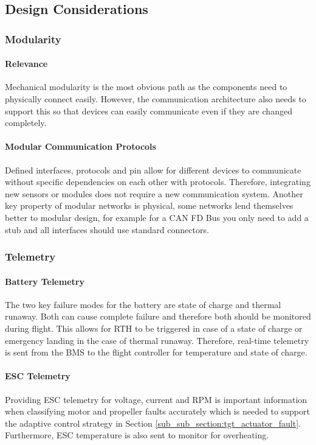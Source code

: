 \subsection{Design Considerations}\label{sub_sub_section:tgt_intra_comms_design_considerations}

\subsubsection{Modularity}\label{sub_sub_section:tgt_modularity}
\paragraph{Relevance}
Mechanical modularity is the most obvious path as the components need to physically connect easily. However, the communication architecture also needs to support this so that devices can easily communicate even if they are changed completely.
\paragraph{Modular Communication Protocols}
Defined interfaces, protocols and pin allow for different devices to communicate without specific dependencies on each other with protocols. Therefore, integrating new sensors or modules does not require a new communication system. Another key property of modular networks is physical, some networks lend themselves better to modular design, for example for a \gls{CAN} FD Bus you only need to add a stub and all interfaces should use standard connectors.

\subsubsection{Telemetry}\label{sub_sub_section:tgt_telemetry}
\paragraph{Battery Telemetry}
The two key failure modes for the battery are state of charge and thermal runaway. Both can cause complete failure and therefore both should be monitored during flight. This allows for \gls{RTH} to be triggered in case of a state of charge or emergency landing in the case of thermal runaway. Therefore, real-time telemetry is sent from the \gls{BMS} to the flight controller for temperature and state of charge.
\paragraph{\gls{ESC} Telemetry}
Providing \gls{ESC} telemetry for voltage, current and \gls{RPM} is important information when classifying motor and propeller faults accurately which is needed to support the adaptive control strategy in Section \ref{sub_sub_section:tgt_actuator_fault}. Furthermore, \gls{ESC} temperature is also sent to monitor for overheating. 

